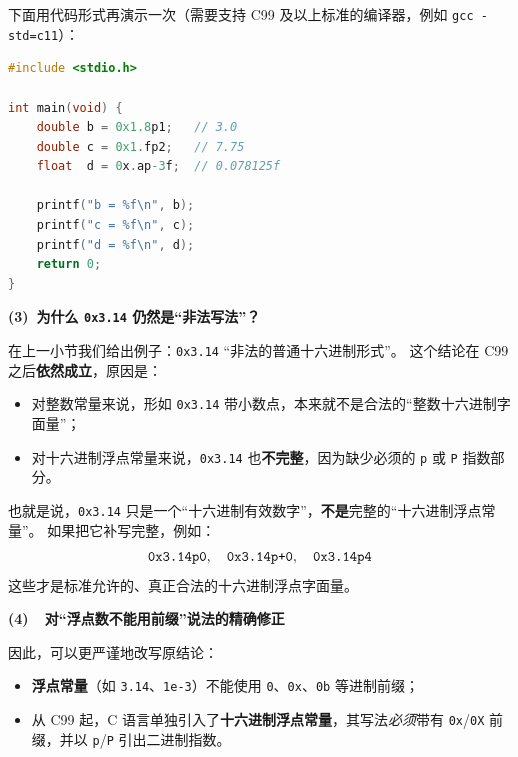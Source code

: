 下面用代码形式再演示一次（需要支持 C99 及以上标准的编译器，例如 \verb|gcc -std=c11|）：

\begin{lstlisting}[language=C,caption={十六进制浮点常量示例},label={code:hex-float}]
#include <stdio.h>

int main(void) {
    double b = 0x1.8p1;   // 3.0
    double c = 0x1.fp2;   // 7.75
    float  d = 0x.ap-3f;  // 0.078125f

    printf("b = %f\n", b);
    printf("c = %f\n", c);
    printf("d = %f\n", d);
    return 0;
}
\end{lstlisting}

\vspace{1em}
\noindent\textbf{(3)~为什么 \texttt{0x3.14} 仍然是“非法写法”？}\par\vspace{0.5em}


在上一小节我们给出例子：\verb|0x3.14| “非法的普通十六进制形式”。  
这个结论在 C99 之后\textbf{依然成立}，原因是：

\begin{itemize}
  \item 对整数常量来说，形如 \verb|0x3.14| 带小数点，本来就不是合法的“整数十六进制字面量”；
  \item 对十六进制浮点常量来说，\verb|0x3.14| 也\textbf{不完整}，因为缺少必须的 \verb|p| 或 \verb|P| 指数部分。
\end{itemize}

也就是说，\verb|0x3.14| 只是一个“十六进制有效数字”，\textbf{不是}完整的“十六进制浮点常量”。  
如果把它补写完整，例如：
\[
  \verb|0x3.14p0|,\quad
  \verb|0x3.14p+0|,\quad
  \verb|0x3.14p4|
\]
这些才是标准允许的、真正合法的十六进制浮点字面量。

\vspace{1em}
\noindent\textbf{(4)~~对“浮点数不能用前缀”说法的精确修正}\par\vspace{0.5em}


因此，可以更严谨地改写原结论：

\begin{itemize}

  \item \textbf{浮点常量}（如 \verb|3.14|、\verb|1e-3|）不能使用 \verb|0|、\verb|0x|、\verb|0b| 等进制前缀；
  \item 从 C99 起，C 语言单独引入了\textbf{十六进制浮点常量}，其写法\emph{必须}带有
        \verb|0x|/\verb|0X| 前缀，并以 \verb|p|/\verb|P| 引出二进制指数。
\end{itemize}


